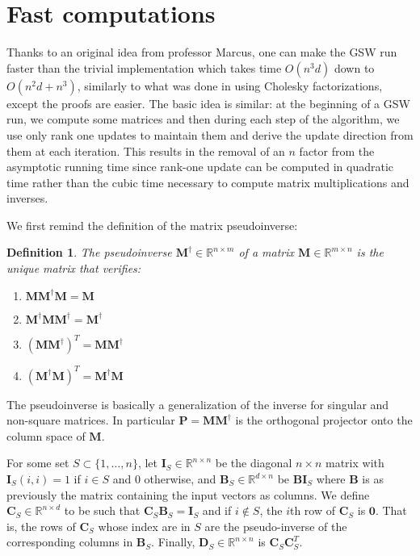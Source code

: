 \documentclass[12pt]{article}
\newtheorem{definition}[theorem]{Definition}
\begin{document}
\section{Fast computations}\label{fast_computations}
Thanks to an original idea from professor Marcus, one can make the GSW run faster than the trivial implementation which takes time $O(n^3d)$ down to $O(n^2d + n^3)$, similarly to what was done in \cite{harshaw2019balancing} using Cholesky factorizations, except the proofs are easier. The basic idea is similar: at the beginning of a GSW run, we compute some matrices and then during each step of the algorithm, we use only rank one updates to maintain them and derive the update direction from them at each iteration. This results in the removal of an $n$ factor from the asymptotic running time since rank-one update can be computed in quadratic time rather than the cubic time necessary to compute matrix multiplications and inverses.

We first remind the definition of the matrix pseudoinverse:
\begin{definition}
The pseudoinverse $\textbf{M}^\dagger\in\mathbb{R}^{n\times m}$ of a matrix $\textbf{M}\in\mathbb{R}^{m\times n}$ is the unique matrix that verifies:
\begin{enumerate}
\item $\textbf{M}\textbf{M}^\dagger\textbf{M}=\textbf{M}$
\item $\textbf{M}^\dagger\textbf{M}\textbf{M}^\dagger=\textbf{M}^\dagger$
\item $(\textbf{M}\textbf{M}^\dagger)^T=\textbf{M}\textbf{M}^\dagger$
\item $(\textbf{M}^\dagger\textbf{M})^T=\textbf{M}^\dagger\textbf{M}$
\end{enumerate}
\end{definition}
The pseudoinverse is basically a generalization of the inverse for singular and non-square matrices. In particular $\textbf{P}=\textbf{M}\textbf{M}^\dagger$ is the orthogonal projector onto the column space of $\textbf{M}$.

For some set $S\subset\{1,\dots,n\}$, let $\textbf{I}_S\in\mathbb{R}^{n\times n}$ be the diagonal $n\times n$ matrix with $\textbf{I}_S(i,i) =1$ if $i\in S$ and $0$ otherwise, and $\textbf{B}_S\in\mathbb{R}^{d\times n}$ be $\textbf{BI}_S$ where $\textbf{B}$ is as previously the matrix containing the input vectors as columns. We define $\textbf{C}_S\in\mathbb{R}^{n\times d}$ to be such that $\textbf{C}_S\textbf{B}_S=\textbf{I}_S$ and if $i\not\in S$, the $i$th row of $\textbf{C}_S$ is $\textbf{0}$. That is, the rows of $\textbf{C}_S$ whose index are in $S$ are the pseudo-inverse of the corresponding columns in $\textbf{B}_S$. Finally, $\textbf{D}_S\in\mathbb{R}^{n\times n}$ is $\textbf{C}_S\textbf{C}_S^T$.
\end{document}
